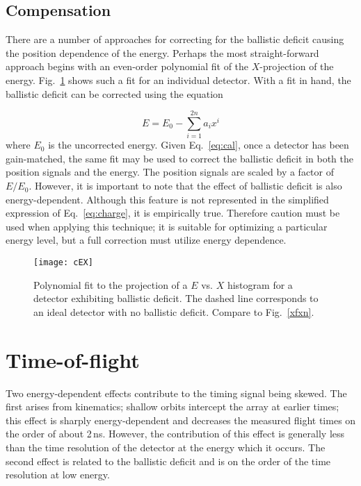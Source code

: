 \subsection{Compensation}
There are a number of approaches for correcting for the ballistic deficit causing the position dependence of the energy.  Perhaps the most straight-forward approach begins with an even-order polynomial fit of the $X$-projection of the energy.  Fig.~\ref{energy_plot} shows such a fit for an individual detector.  With a fit in hand, the ballistic deficit can be corrected using the equation  

\begin{equation}
E=E_0-\sum_{i=1}^{2n} a_i x^i
\label{ecal}
\end{equation}
where $E_0$ is the uncorrected energy.  Given Eq.~\ref{eq:cal}, once a detector has been gain-matched, the same fit may be used to correct the ballistic deficit in both the position signals and the energy.  The position signals are scaled by a factor of $E/E_0$.  However, it is important to note that the effect of ballistic deficit is also energy-dependent.  Although this feature is not represented in the simplified expression of Eq.~\ref{eq:charge}, it is empirically true.  Therefore caution must be used when applying this technique; it is suitable for optimizing a particular energy level, but a full correction must utilize energy dependence.

\begin{figure}%
\centering
\texttt{[image: cEX]}%
\caption[Polynomial fit to the projection of a $E$ vs. $X$ histogram for a detector exhibiting ballistic deficit]{Polynomial fit to the projection of a $E$ vs. $X$ histogram for a detector exhibiting ballistic deficit.  The dashed line corresponds to an ideal detector with no ballistic deficit.  Compare to Fig.~\ref{xfxn}. }

\label{energy_plot}%
\end{figure}

\section{Time-of-flight} 
Two energy-dependent effects contribute to the timing signal being skewed.  The first arises from kinematics; shallow orbits intercept the array at earlier times; this effect is sharply energy-dependent and decreases the measured flight times on the order of about 2\,ns.  However, the contribution of this effect is generally less than the time resolution of the detector at the energy which it occurs.  The second effect is related to the ballistic deficit and is on the order of the time resolution at low energy.

